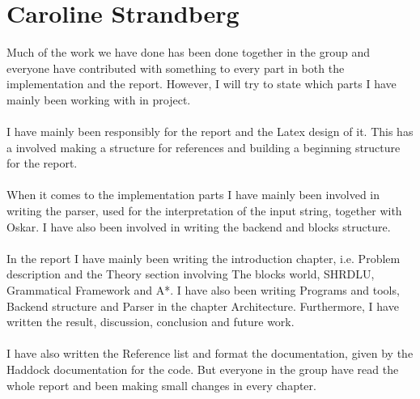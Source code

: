 \section*{Caroline Strandberg}
Much of the work we have done has been done together in the group and everyone have contributed with something to every part in both the implementation and the report. However, I will try to state which parts I have mainly been working with in project. 
\\\\
I have mainly been responsibly for the report and the Latex design of it. This has a involved making a structure for references and building a beginning structure for the report.
\\\\
When it comes to the implementation parts I have mainly been involved in writing the parser, used for the interpretation of the input string, together with Oskar. I have also been involved in writing the backend and blocks structure. 
\\\\
In the report I have mainly been writing the introduction chapter, i.e. Problem description and the Theory section involving The blocks world, SHRDLU, Grammatical Framework and A*. I have also been writing Programs and tools, Backend structure and Parser in the chapter Architecture. Furthermore, I have written the result, discussion, conclusion and future work. 
\\\\
I have also written the Reference list and format the documentation, given by the Haddock documentation for the code. But everyone in the group have read the whole report and been making small changes in every chapter.

